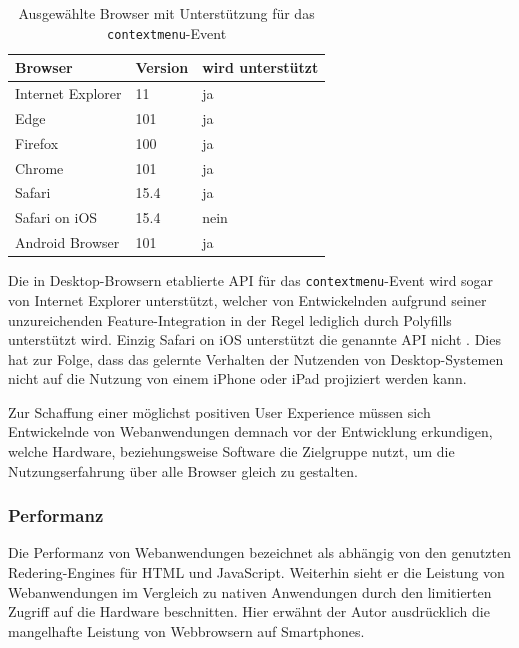 \documentclass[a4paper]{scrartcl}
\begin{document}
\begin{table}[H]
 	\centering
 	\caption{Ausgewählte Browser mit Unterstützung für das \texttt{contextmenu}-Event}
 	\begin{center}
 		\begin{tabularx}{\linewidth}{| Y | Y | Y |}
 			\hline
 			\textbf{Browser} & \textbf{Version} & \textbf{wird unterstützt} \\
 			\hline \hline
 			Internet Explorer & 11 & ja \\
 			\hline
 			Edge & 101 & ja \\
 			\hline
 			Firefox & 100 & ja \\
 			\hline
 			Chrome & 101 & ja \\
 			\hline
 			Safari & 15.4 & ja \\
 			\hline
 			Safari on iOS & 15.4 & nein \\
 			\hline
 			Android Browser & 101 & ja \\
 			\hline
 		\end{tabularx}
 	\end{center}
 	Die in Desktop-Browsern etablierte API für das \texttt{contextmenu}-Event wird sogar von Internet Explorer unterstützt, welcher von Entwickelnden aufgrund seiner unzureichenden Feature-Integration in der Regel lediglich durch Polyfills unterstützt wird. Einzig Safari on iOS unterstützt die genannte API nicht \autocite{contextmenu-event}. Dies hat zur Folge, dass das gelernte Verhalten der Nutzenden von Desktop-Systemen nicht auf die Nutzung von einem iPhone oder iPad projiziert werden kann.
 \end{table}
 
 Zur Schaffung einer möglichst positiven User Experience müssen sich Entwickelnde von Webanwendungen demnach vor der Entwicklung erkundigen, welche Hardware, beziehungsweise Software die Zielgruppe nutzt, um die Nutzungserfahrung über alle Browser gleich zu gestalten.

\subsubsection{Performanz}

Die Performanz von Webanwendungen bezeichnet \textcite[28]{Jobe} als abhängig von den genutzten Redering-Engines für HTML und JavaScript. Weiterhin sieht er die Leistung von Webanwendungen im Vergleich zu nativen Anwendungen durch den limitierten Zugriff auf die Hardware beschnitten. Hier erwähnt der Autor ausdrücklich die mangelhafte Leistung von Webbrowsern auf Smartphones. \\
\end{document}
